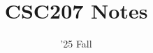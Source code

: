 \documentclass[11pt]{scrartcl}
\begin{document}
\title{CSC207 Notes}
\date{'25 Fall} %
\maketitle

\setcounter{tocdepth}{1}
\tableofcontents
\newpage

 \newpage

\end{document}
